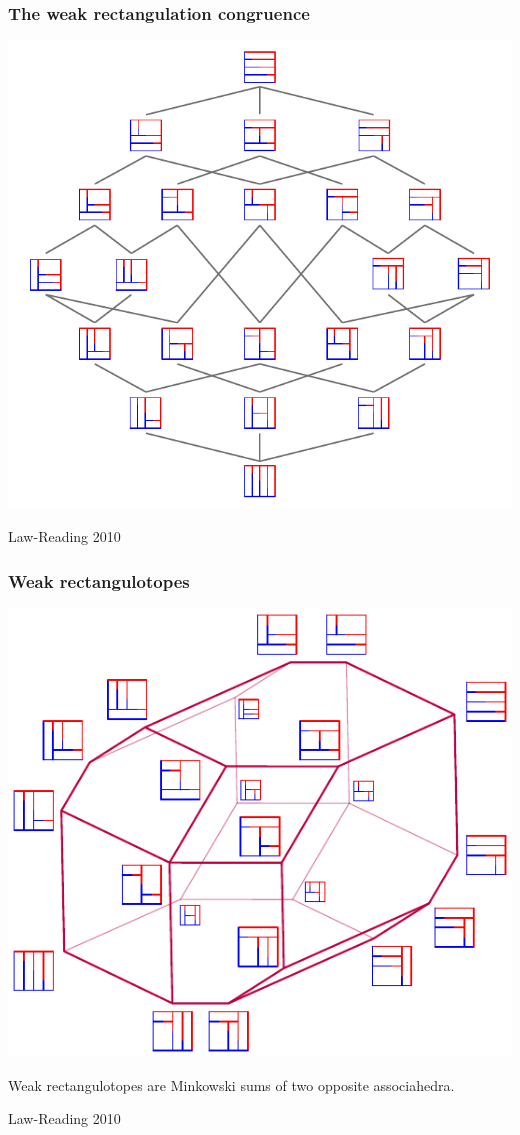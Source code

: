 \documentclass[11pt]{beamer}%
\newcommand{\green}{\color{darkgreen}}
\newcommand{\auth}[1]{{\green\hfill{\footnotesize #1}}}
\begin{document}
\begin{frame}
  \frametitle{The weak rectangulation congruence}
    \begin{center}
      \includegraphics[height=.7\textheight]{weakRectangulationLattice.pdf}
    \end{center}
    \auth{Law-Reading 2010} 
\end{frame}

\begin{frame}
  \frametitle{Weak rectangulotopes}
    \begin{center}
      \includegraphics[height=.6\textheight]{weakRectangulotopeLabeled.pdf}
    \end{center}
    \begin{theorem}
      Weak rectangulotopes are Minkowski sums of two opposite associahedra.
      \end{theorem}
    \auth{Law-Reading 2010}
\end{frame}
\end{document}
